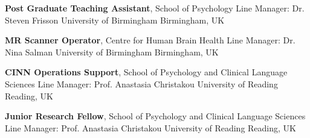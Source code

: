 	{\textbf{Post Graduate Teaching Assistant}, School of Psychology}
	{Line Manager: Dr. Steven Frisson}
	{University of Birmingham}
	{Birmingham, UK}

	{\textbf{MR Scanner Operator}, Centre for Human Brain Health}
	{Line Manager: Dr. Nina Salman}
	{University of Birmingham}
	{Birmingham, UK}

	{\textbf{CINN Operations Support}, School of Psychology and Clinical Language Sciences}
	{Line Manager: Prof. Anastasia Christakou}
	{University of Reading}
	{Reading, UK}

	{\textbf{Junior Research Fellow}, School of Psychology and Clinical Language Sciences}
	{Line Manager: Prof. Anastasia Christakou}
	{University of Reading}
	{Reading, UK}
